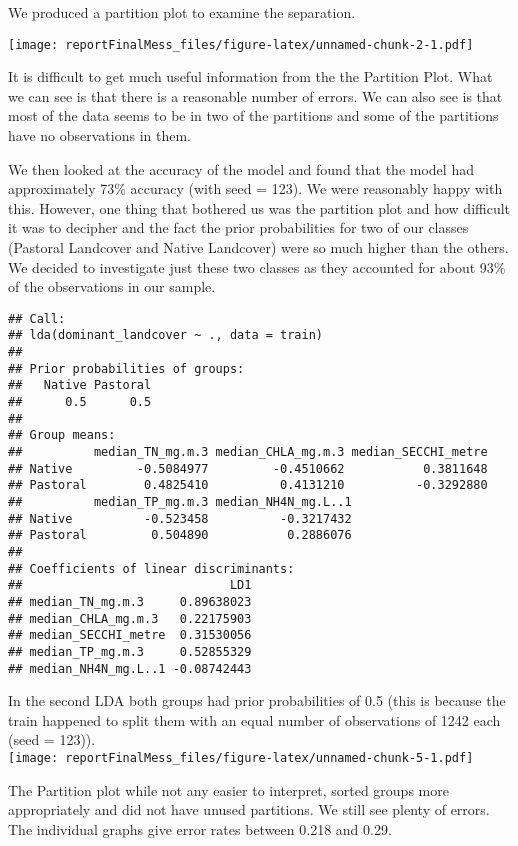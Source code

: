 \documentclass[
]{article}
\begin{document}
We produced a partition plot to examine the separation.

\texttt{[image: reportFinalMess\_files/figure-latex/unnamed-chunk-2-1.pdf]}

It is difficult to get much useful information from the the Partition Plot. What we can see is that there is a reasonable number of errors. We can also see is that most of the data seems to be in two of the partitions and some of the partitions have no observations in them.

We then looked at the accuracy of the model and found that the model had approximately 73\% accuracy (with seed = 123). We were reasonably happy with this. However, one thing that bothered us was the partition plot and how difficult it was to decipher and the fact the prior probabilities for two of our classes (Pastoral Landcover and Native Landcover) were so much higher than the others. We decided to investigate just these two classes as they accounted for about 93\% of the observations in our sample.

\begin{verbatim}
## Call:
## lda(dominant_landcover ~ ., data = train)
## 
## Prior probabilities of groups:
##   Native Pastoral 
##      0.5      0.5 
## 
## Group means:
##          median_TN_mg.m.3 median_CHLA_mg.m.3 median_SECCHI_metre
## Native         -0.5084977         -0.4510662           0.3811648
## Pastoral        0.4825410          0.4131210          -0.3292880
##          median_TP_mg.m.3 median_NH4N_mg.L..1
## Native          -0.523458          -0.3217432
## Pastoral         0.504890           0.2886076
## 
## Coefficients of linear discriminants:
##                             LD1
## median_TN_mg.m.3     0.89638023
## median_CHLA_mg.m.3   0.22175903
## median_SECCHI_metre  0.31530056
## median_TP_mg.m.3     0.52855329
## median_NH4N_mg.L..1 -0.08742443
\end{verbatim}

In the second LDA both groups had prior probabilities of 0.5 (this is because the train happened to split them with an equal number of observations of 1242 each (seed = 123)).\\

\texttt{[image: reportFinalMess\_files/figure-latex/unnamed-chunk-5-1.pdf]}

The Partition plot while not any easier to interpret, sorted groups more appropriately and did not have unused partitions. We still see plenty of errors. The individual graphs give error rates between 0.218 and 0.29.
\end{document}
